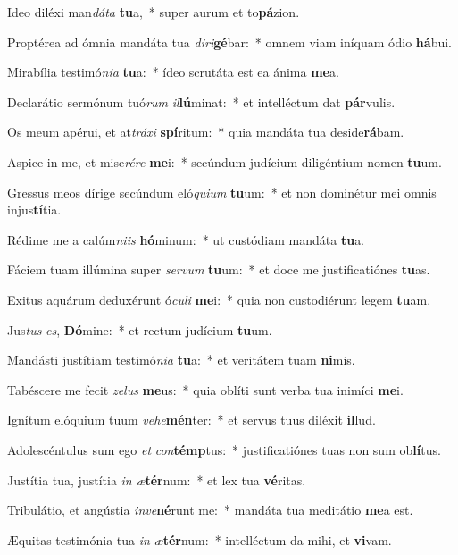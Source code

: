 \item Ideo diléxi man\textit{dá}\textit{ta} \textbf{tu}a,~* super aurum et to\textbf{pá}zion.
\item Proptérea ad ómnia mandáta tua \textit{di}\textit{ri}\textbf{gé}bar:~* omnem viam iníquam ódio \textbf{há}bui.
\item Mirabília testimó\textit{ni}\textit{a} \textbf{tu}a:~* ídeo scrutáta est ea ánima \textbf{me}a.
\item Declarátio sermónum tuó\textit{rum} \textit{il}\textbf{lú}minat:~* et intelléctum dat \textbf{pár}vulis.
\item Os meum apérui, et at\textit{trá}\textit{xi} \textbf{spí}ritum:~* quia mandáta tua deside\textbf{rá}bam.
\item Aspice in me, et mise\textit{ré}\textit{re} \textbf{me}i:~* secúndum judícium diligéntium nomen \textbf{tu}um.
\item Gressus meos dírige secúndum eló\textit{qui}\textit{um} \textbf{tu}um:~* et non dominétur mei omnis injus\textbf{tí}tia.
\item Rédime me a calúm\textit{ni}\textit{is} \textbf{hó}minum:~* ut custódiam mandáta \textbf{tu}a.
\item Fáciem tuam illúmina super \textit{ser}\textit{vum} \textbf{tu}um:~* et doce me justificatiónes \textbf{tu}as.
\item Exitus aquárum deduxérunt ó\textit{cu}\textit{li} \textbf{me}i:~* quia non custodiérunt legem \textbf{tu}am.
\item Jus\textit{tus} \textit{es}, \textbf{Dó}mine:~* et rectum judícium \textbf{tu}um.
\item Mandásti justítiam testimó\textit{ni}\textit{a} \textbf{tu}a:~* et veritátem tuam \textbf{ni}mis.
\item Tabéscere me fecit \textit{ze}\textit{lus} \textbf{me}us:~* quia oblíti sunt verba tua inimíci \textbf{me}i.
\item Ignítum elóquium tuum \textit{ve}\textit{he}\textbf{mén}ter:~* et servus tuus diléxit \textbf{il}lud.
\item Adolescéntulus sum ego \textit{et} \textit{con}\textbf{témp}tus:~* justificatiónes tuas non sum ob\textbf{lí}tus.
\item Justítia tua, justítia \textit{in} \textit{æ}\textbf{tér}num:~* et lex tua \textbf{vé}ritas.
\item Tribulátio, et angústia \textit{in}\textit{ve}\textbf{né}runt me:~* mandáta tua meditátio \textbf{me}a est.
\item Æquitas testimónia tua \textit{in} \textit{æ}\textbf{tér}num:~* intelléctum da mihi, et \textbf{vi}vam.
